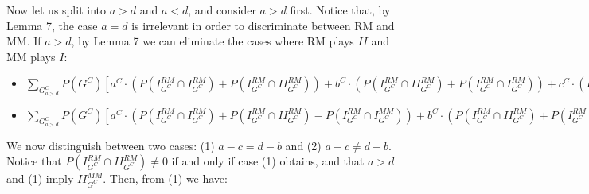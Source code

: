 \documentclass[fleqn,reqno,11pt]{article}
\begin{document}
\noindent Now let us split into $a>d$ and $a<d$, and consider $a>d$ first.
Notice that, by Lemma 7, the case $a=d$ is irrelevant in order to
discriminate between RM and MM. If $a>d$, by Lemma 7 we can eliminate
the cases where RM plays $II$ and MM plays $I$:

\begin{itemize}

\item $\sum_{G_{a>d}^{C}} P(G^{C})[a^{C} \cdot (P(I_{G^{C}}^{RM}\cap I_{G^{C}}^{RM}) + P(I_{G^{C}}^{RM}\cap II_{G^{C}}^{RM})) + b^{C} \cdot  (P(I_{G^{C}}^{RM}\cap II_{G^{C}}^{RM}) + P(I_{G^{C}}^{RM}\cap I_{G^{C}}^{RM})) + c^{C} \cdot (P(II_{G^{C}}^{RM}\cap I_{G^{C}}^{RM}) +P(II_{G^{C}}^{RM}\cap II_{G^{C}}^{RM})) + d^{C} \cdot (P(II_{G^{C}}^{RM}\cap II_{G^{C}}^{RM})+P(II_{G^{C}}^{RM}\cap I_{G^{C}}^{RM}))]> 
\sum_{G_{a>d}^{C}} P(G^{C})[a^{C} \cdot P(I_{G^{C}}^{RM}\cap I_{G^{C}}^{MM}) + b^{C} \cdot P(I_{G^{C}}^{RM}\cap I_{G^{C}}^{MM}) + c^{C} \cdot (P(I_{G^{C}}^{RM}\cap II_{G^{C}}^{MM})+P(II_{G^{C}}^{RM}\cap II_{G^{C}}^{MM})) + d^{C} \cdot (P(II_{G^{C}}^{RM}\cap II_{G^{C}}^{MM})+P(I_{G^{C}}^{RM}\cap II_{G^{C}}^{MM}))]$

\item $\sum_{G_{a>d}^{C}} P(G^{C})[a^{C} \cdot (P(I_{G^{C}}^{RM}\cap I_{G^{C}}^{RM}) + P(I_{G^{C}}^{RM}\cap II_{G^{C}}^{RM})- P(I_{G^{C}}^{RM}\cap I_{G^{C}}^{MM})) + b^{C} \cdot  (P(I_{G^{C}}^{RM}\cap II_{G^{C}}^{RM}) + P(I_{G^{C}}^{RM}\cap I_{G^{C}}^{RM})- P(I_{G^{C}}^{RM}\cap I_{G^{C}}^{MM})) + c^{C} \cdot (P(II_{G^{C}}^{RM}\cap I_{G^{C}}^{RM}) +P(II_{G^{C}}^{RM}\cap II_{G^{C}}^{RM})- P(I_{G^{C}}^{RM}\cap II_{G^{C}}^{MM})- P(II_{G^{C}}^{RM}\cap II_{G^{C}}^{MM})) + d^{C} \cdot (P(II_{G^{C}}^{RM}\cap II_{G^{C}}^{RM})+P(II_{G^{C}}^{RM}\cap I_{G^{C}}^{RM})- P(II_{G^{C}}^{RM}\cap II_{G^{C}}^{MM})- P(I_{G^{C}}^{RM}\cap II_{G^{C}}^{MM}))]> 0$

\end{itemize}

\noindent We now distinguish between two cases: (1) $ a-c = d-b $ and (2) $  a-c \neq d-b $. Notice that $P(I_{G^{C}}^{RM}\cap II_{G^{C}}^{RM}) \neq 0$ if and only if case (1) obtains, and that $a>d$ and (1) imply $II_{G^{C}}^{MM}$. Then, from (1) we have:
\end{document}
